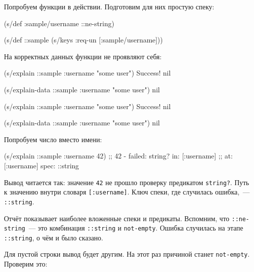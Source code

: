 Попробуем функции в действии. Подготовим для них простую спеку:

\begin{english}
  \begin{clojure}
(s/def :sample/username ::ne-string)

(s/def ::sample
  (s/keys :req-un [:sample/username]))
  \end{clojure}
\end{english}

\noindent
На корректных данных функции не проявляют себя:

\ifx\devicetype\mobile

\begin{english}
  \begin{clojure}
(s/explain ::sample
  {:username "some user"})
Success!
nil

(s/explain-data ::sample
  {:username "some user"})
nil
  \end{clojure}
\end{english}

\else

\begin{english}
  \begin{clojure}
(s/explain ::sample {:username "some user"})
Success!
nil

(s/explain-data ::sample {:username "some user"})
nil
  \end{clojure}
\end{english}

\fi

\noindent
Попробуем число вместо имени:

\begin{english}
  \begin{clojure}
(s/explain ::sample {:username 42})
;; 42 - failed: string? in: [:username]
;; at: [:username] spec: ::string
  \end{clojure}
\end{english}

Вывод читается так: значение \verb|42| не прошло проверку предикатом
\verb|string?|. Путь к значению внутри словаря \verb|[:username]|. Ключ
спеки, где случилась ошибка,~--- \verb|::string|.

Отчёт показывает наиболее вложенные спеки и предикаты. Вспомним, что
\verb|::ne-string|~--- это комбинация \verb|::string| и
\verb|not-empty|. Ошибка случилась на этапе \verb|::string|, о чём и было
сказано.

Для пустой строки вывод будет другим. На этот раз причиной станет
\verb|not-empty|. Проверим это:

